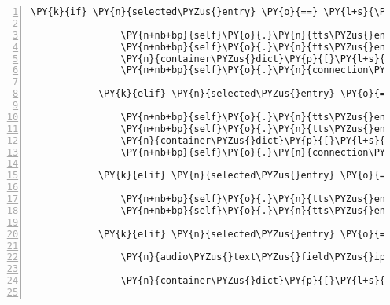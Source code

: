 \begin{Verbatim}[commandchars=\\\{\},numbers=left,firstnumber=1,stepnumber=1]
            \PY{k}{if} \PY{n}{selected\PYZus{}entry} \PY{o}{==} \PY{l+s}{\PYZsq{}}\PY{l+s}{Als Cassandra spielen}\PY{l+s}{\PYZsq{}}\PY{p}{:}

                \PY{n+nb+bp}{self}\PY{o}{.}\PY{n}{tts\PYZus{}engine}\PY{o}{.}\PY{n}{say}\PY{p}{(}\PY{l+s}{\PYZdq{}}\PY{l+s}{Spiel startet als Cassandra}\PY{l+s}{\PYZdq{}}\PY{p}{)}
                \PY{n+nb+bp}{self}\PY{o}{.}\PY{n}{tts\PYZus{}engine}\PY{o}{.}\PY{n}{runAndWait}\PY{p}{(}\PY{p}{)}
                \PY{n}{container\PYZus{}dict}\PY{p}{[}\PY{l+s}{\PYZsq{}}\PY{l+s}{login\PYZus{}name}\PY{l+s}{\PYZsq{}}\PY{p}{]} \PY{o}{=} \PY{l+s}{\PYZsq{}}\PY{l+s}{cassandra}\PY{l+s}{\PYZsq{}}
                \PY{n+nb+bp}{self}\PY{o}{.}\PY{n}{connection\PYZus{}details\PYZus{}complete} \PY{o}{=} \PY{n+nb+bp}{True}

            \PY{k}{elif} \PY{n}{selected\PYZus{}entry} \PY{o}{==} \PY{l+s}{\PYZsq{}}\PY{l+s}{Als Kuni spielen}\PY{l+s}{\PYZsq{}}\PY{p}{:}

                \PY{n+nb+bp}{self}\PY{o}{.}\PY{n}{tts\PYZus{}engine}\PY{o}{.}\PY{n}{say}\PY{p}{(}\PY{l+s}{\PYZdq{}}\PY{l+s}{Spiel startet als Kuni}\PY{l+s}{\PYZdq{}}\PY{p}{)}
                \PY{n+nb+bp}{self}\PY{o}{.}\PY{n}{tts\PYZus{}engine}\PY{o}{.}\PY{n}{runAndWait}\PY{p}{(}\PY{p}{)}
                \PY{n}{container\PYZus{}dict}\PY{p}{[}\PY{l+s}{\PYZsq{}}\PY{l+s}{login\PYZus{}name}\PY{l+s}{\PYZsq{}}\PY{p}{]} \PY{o}{=} \PY{l+s}{\PYZsq{}}\PY{l+s}{kuni}\PY{l+s}{\PYZsq{}}
                \PY{n+nb+bp}{self}\PY{o}{.}\PY{n}{connection\PYZus{}details\PYZus{}complete} \PY{o}{=} \PY{n+nb+bp}{True}

            \PY{k}{elif} \PY{n}{selected\PYZus{}entry} \PY{o}{==} \PY{l+s}{\PYZsq{}}\PY{l+s}{Ei Pi Adresse}\PY{l+s}{\PYZsq{}}\PY{p}{:}

                \PY{n+nb+bp}{self}\PY{o}{.}\PY{n}{tts\PYZus{}engine}\PY{o}{.}\PY{n}{say}\PY{p}{(}\PY{n}{container\PYZus{}dict}\PY{p}{[}\PY{l+s}{\PYZsq{}}\PY{l+s}{connector}\PY{l+s}{\PYZsq{}}\PY{p}{]}\PY{p}{)}
                \PY{n+nb+bp}{self}\PY{o}{.}\PY{n}{tts\PYZus{}engine}\PY{o}{.}\PY{n}{runAndWait}\PY{p}{(}\PY{p}{)}

            \PY{k}{elif} \PY{n}{selected\PYZus{}entry} \PY{o}{==} \PY{l+s}{\PYZsq{}}\PY{l+s}{Eine neue Ei Pi Adresse eingeben}\PY{l+s}{\PYZsq{}}\PY{p}{:}

                \PY{n}{audio\PYZus{}text\PYZus{}field\PYZus{}ip\PYZus{}address}\PY{o}{.}\PY{n}{focus\PYZus{}audio\PYZus{}text\PYZus{}field}\PY{p}{(}\PY{p}{)}

                \PY{n}{container\PYZus{}dict}\PY{p}{[}\PY{l+s}{\PYZsq{}}\PY{l+s}{connector}\PY{l+s}{\PYZsq{}}\PY{p}{]} \PY{o}{=} \PY{n}{audio\PYZus{}text\PYZus{}field\PYZus{}ip\PYZus{}address}\PY{o}{.}\PY{n}{process\PYZus{}key\PYZus{}input}\PY{p}{(}\PY{p}{)}


\end{Verbatim}
